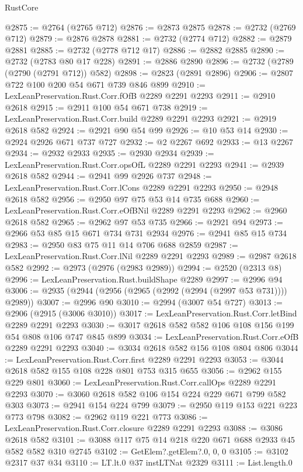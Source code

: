 \begin{lexlean}{RustCore}
\begin{coremodule}
@2875 := @2764 (@2765 @712)
@2876 := @2873 @2875
@2878 := @2732 (@2769 @712)
@2879 := @2876 @2878
@2881 := @2732 (@2774 @712)
@2882 := @2879 @2881
@2885 := @2732 (@2778 @712 @17)
@2886 := @2882 @2885
@2890 := @2732 (@2783 @80 @17 @228)
@2891 := @2886 @2890
@2896 := @2732 (@2789 (@2790 (@2791 @712)) @582)
@2898 := @2823 (@2891 @2896)
@2906 := @2807 @722 @100 @200 @54 @671 @739 @846 @899
@2910 := LexLeanPreservation.Rust.Corr.fOfB @2289 @2291 @2293
@2911 := @2910 @2618
@2915 := @2911 @100 @54 @671 @738
@2919 := LexLeanPreservation.Rust.Corr.build @2289 @2291 @2293
@2921 := @2919 @2618 @582
@2924 := @2921 @90 @54 @99
@2926 := @10 @53 @14
@2930 := @2924 @2926 @671 @737 @727
@2932 := @2 @2267 @692
@2933 := @13 @2267
@2934 := @2932 @2933
@2935 := @2930 @2934
@2939 := LexLeanPreservation.Rust.Corr.opsOfL @2289 @2291 @2293
@2941 := @2939 @2618 @582
@2944 := @2941 @99 @2926 @737
@2948 := LexLeanPreservation.Rust.Corr.lCons @2289 @2291 @2293
@2950 := @2948 @2618 @582
@2956 := @2950 @97 @75 @53 @14 @735 @688
@2960 := LexLeanPreservation.Rust.Corr.eOfBNil @2289 @2291 @2293
@2962 := @2960 @2618 @582
@2965 := @2962 @97 @53 @735
@2966 := @2921 @94
@2973 := @2966 @53 @85 @15 @671 @734 @731 @2934
@2976 := @2941 @85 @15 @734
@2983 := @2950 @83 @75 @11 @14 @706 @688 @2859
@2987 := LexLeanPreservation.Rust.Corr.lNil @2289 @2291 @2293
@2989 := @2987 @2618 @582
@2992 := @2973 (@2976 (@2983 @2989))
@2994 := @2520 (@2313 @8)
@2996 := LexLeanPreservation.Rust.buildShape @2289
@2997 := @2996 @94
@3006 := @2935 (@2944 (@2956 (@2965 (@2992 (@2994 (@2997 @53 @731)))) @2989))
@3007 := @2996 @90
@3010 := @2994 (@3007 @54 @727)
@3013 := @2906 (@2915 (@3006 @3010))
@3017 := LexLeanPreservation.Rust.Corr.letBind @2289 @2291 @2293
@3030 := @3017 @2618 @582 @582 @106 @108 @156 @199 @54 @808 @106 @747 @845 @899
@3034 := LexLeanPreservation.Rust.Corr.eOfB @2289 @2291 @2293
@3040 := @3034 @2618 @582 @156 @108 @804 @806
@3044 := LexLeanPreservation.Rust.Corr.first @2289 @2291 @2293
@3053 := @3044 @2618 @582 @155 @108 @228 @801 @753 @315 @655
@3056 := @2962 @155 @229 @801
@3060 := LexLeanPreservation.Rust.Corr.callOps @2289 @2291 @2293
@3070 := @3060 @2618 @582 @106 @154 @224 @229 @671 @799 @582 @303
@3073 := @2941 @154 @224 @799
@3079 := @2950 @119 @153 @221 @223 @773 @798
@3082 := @2962 @119 @221 @773
@3086 := LexLeanPreservation.Rust.Corr.closure @2289 @2291 @2293
@3088 := @3086 @2618 @582
@3101 := @3088 @117 @75 @14 @218 @220 @671 @688 @2933 @45 @582 @582 @310 @2745
@3102 := GetElem?.getElem?.{0, 0, 0}
@3105 := @3102 @2317 @37 @34
@3110 := LT.lt.{0} @37 instLTNat @2329
@3111 := List.length.{0}

\end{coremodule}
\end{lexlean}
